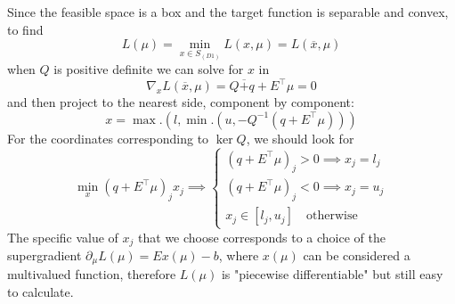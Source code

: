 \documentclass[10pt,twoside,book,a5paper]{ncc}
\begin{document}
Since the feasible space is a box and the target function is separable and convex, to find
\[
    L(\mu) = \min_{x \in S_{(D1)}} L(x, \mu) = L(\overline{x}, \mu)
\]
when $Q$ is positive definite we can solve for $x$ in
\[
    \nabla_x L(\overline{x}, \mu) = Q \overline + q + E^\intercal\mu = 0
\]
and then project to the nearest side, component by component:
\[
    x = \max.(l, \min.(u, -Q^{-1}(q + E^\intercal\mu)))
\]
For the coordinates corresponding to $\ker Q$, we should look for
\[
    \label{eq:1}\min_x (q + E^\intercal \mu)_j x_j \implies \begin{cases}
        (q + E^\intercal \mu)_j > 0 \implies x_j = l_j \\
        (q + E^\intercal \mu)_j < 0 \implies x_j = u_j \\
        x_j \in [l_j, u_j] \quad \textrm{otherwise}
    \end{cases}
\]
The specific value of $x_j$ that we choose corresponds to a choice of the supergradient $\partial_\mu L(\mu) = E x(\mu) - b$, where $x(\mu)$ can be considered a multivalued function, therefore $L(\mu)$ is "piecewise differentiable" but still easy to calculate.
\end{document}
